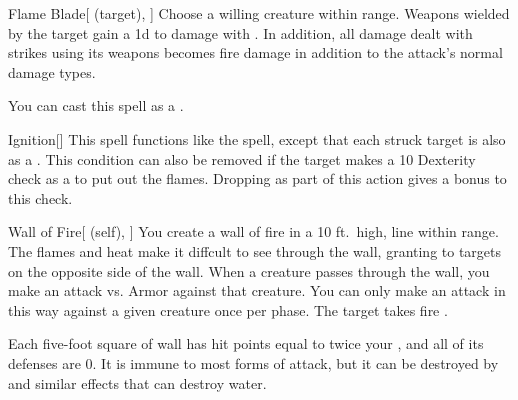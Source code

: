 \lowercase{\hypertarget{spell:Flame Blade}{}}\label{spell:Flame Blade}
\begin{attuneability}[\nth{2}]{\hypertarget{spell:Flame Blade}{Flame Blade}}[ (target), ]
Choose a willing creature within \rngclose range.
Weapons wielded by the target gain a \plus1d  to damage with .
In addition, all damage dealt with strikes using its weapons becomes fire damage in addition to the attack's normal damage types.

You can cast this spell as a .
\end{attuneability}
\vspace{0.25em}



\lowercase{\hypertarget{spell:Ignition}{}}\label{spell:Ignition}
\begin{apability}[\nth{2}]{\hypertarget{spell:Ignition}{Ignition}}[]
This spell functions like the  spell, except that each struck target is also  as a .
This condition can also be removed if the target makes a  10 Dexterity check as a  to put out the flames.
Dropping  as part of this action gives a  bonus to this check.
\end{apability}
\vspace{0.25em}



\lowercase{\hypertarget{spell:Wall of Fire}{}}\label{spell:Wall of Fire}
\begin{attuneability}[\nth{2}]{\hypertarget{spell:Wall of Fire}{Wall of Fire}}[ (self), ]
You create a wall of fire in a 10 ft.\ high, \arealarge line within \rngmed range.
The flames and heat make it diffcult to see through the wall, granting  to targets on the opposite side of the wall.
When a creature passes through the wall, you make an attack vs. Armor against that creature.
You can only make an attack in this way against a given creature once per phase.
\hit The target takes fire .

Each five-foot square of wall has hit points equal to twice your , and all of its defenses are 0.
It is immune to most forms of attack, but it can be destroyed by  and similar effects that can destroy water.
\end{attuneability}
\vspace{0.25em}



